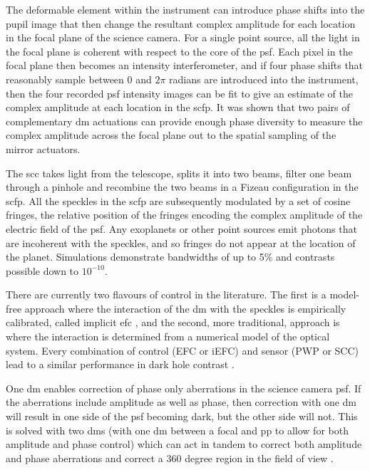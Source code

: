\documentclass[letterpaper]{ar-1col}
\begin{document}
The deformable element within the instrument can introduce phase shifts into the pupil image that then change the resultant complex amplitude for each location in the focal plane of the science camera.
%
For a single point source, all the light in the focal plane is coherent with respect to the core of the \ac{psf}.
%
Each pixel in the focal plane then becomes an intensity interferometer, and if four phase shifts that reasonably sample between $0$ and $2\pi$ radians are introduced into the instrument, then the four recorded \ac{psf} intensity images can be fit to give an estimate of the complex amplitude at each location in the \ac{scfp}.
%
It was shown that two pairs of complementary \ac{dm} actuations can provide enough phase diversity to measure the complex amplitude across the focal plane out to the spatial sampling of the mirror actuators.

The \acl{scc} \citep[\acs{scc}; ][]{Baudoz06} takes light from the telescope, splits it into two beams, filter one beam through a pinhole and recombine the two beams in a Fizeau configuration in the \ac{scfp}.
%
All the speckles in the \ac{scfp} are subsequently modulated by a set of cosine fringes, the relative position of the fringes encoding the complex amplitude of the electric field of the \ac{psf}.
%
Any exoplanets or other point sources emit photons that are incoherent with the speckles, and so fringes do not appear at the location of the planet.
%
Simulations demonstrate \citep{Galicher10} bandwidths of up to 5\% and contrasts possible down to $10^{-10}$.

There are currently two flavours of control in the literature.
%
The first is a model-free approach where the interaction of the \ac{dm} with the speckles is empirically calibrated, called implicit \ac{efc} \citep{haffert2023implicit}, and the second, more traditional, approach is where the interaction is determined from a numerical model of the optical system.
%
Every combination of control (EFC or iEFC) and sensor (PWP or SCC) lead to a similar performance in dark hole contrast \citep{desai2024comparative}.

One \ac{dm} enables correction of phase only aberrations in the science camera \ac{psf}.
%
If the aberrations include amplitude as well as phase, then correction with one \ac{dm} will result in one side of the \ac{psf} becoming dark, but the other side will not.
%
This is solved with two \acp{dm} (with one \ac{dm} between a focal and \ac{pp} to allow for both amplitude and phase control) which can act in tandem to correct both amplitude and phase aberrations and correct a 360 degree region in the field of view \citep{pueyo2009optimal}.
\end{document}
